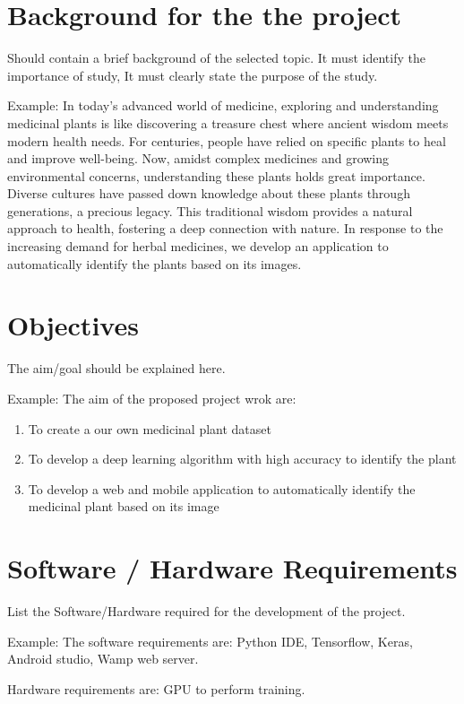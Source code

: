 \documentclass[12pt,a4paper]{report}
\begin{document}
\section*{Background for the  the project}
Should contain a brief background of the selected topic. It must identify the importance of study, It must clearly state the purpose of the study. 

Example: In today’s advanced world of medicine, exploring and understanding medicinal plants is like discovering a treasure chest where ancient wisdom meets modern health needs. For  centuries, people have relied on specific plants to heal and improve well-being. Now,  amidst complex medicines and growing environmental concerns, understanding these  plants holds great importance.  Diverse cultures have passed down knowledge about  these plants through generations, a precious legacy. This traditional wisdom provides a  natural approach to health, fostering a deep connection with nature. In response to the increasing demand for herbal medicines, we develop an application to automatically identify the plants based on its images. 

\section*{Objectives }
The aim/goal should be explained here.

Example: The aim  of the proposed project wrok are:
\begin{enumerate}
    \item To create a our own medicinal plant dataset
    \item To develop a deep learning algorithm with high accuracy to identify the plant
    \item To develop a web and mobile application to automatically identify the medicinal plant based on its image
\end{enumerate}


\section*{Software / Hardware Requirements}
List the Software/Hardware required for the development of the project. 

Example: 
The software requirements are: Python IDE, Tensorflow, Keras, Android studio, Wamp web server. 

Hardware requirements are: GPU to perform training. 

\newpage
\pagestyle{plain}
\renewcommand{\bibname}{References}
\end{document}
